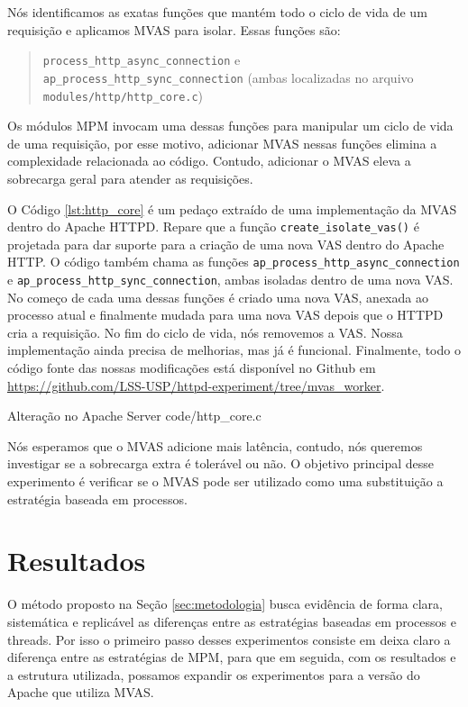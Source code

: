 Nós identificamos as exatas funções que mantém todo o ciclo de vida de um
requisição e aplicamos MVAS para isolar. Essas funções são:

\begin{quote}
  \texttt{process\_http\_async\_connection} e\\
  \texttt{ap\_process\_http\_sync\_connection} (ambas localizadas no arquivo
  \texttt{modules/http/http\_core.c})
\end{quote}

Os módulos MPM invocam uma dessas funções para manipular um ciclo de vida de
uma requisição, por esse motivo, adicionar MVAS nessas funções elimina a
complexidade relacionada ao código. Contudo, adicionar o MVAS eleva a
sobrecarga geral para atender as requisições.

O Código \ref{lst:http_core} é um pedaço extraído de uma implementação da MVAS
dentro do Apache HTTPD. Repare que a função \texttt{create\_isolate\_vas()} é
projetada para dar suporte para a criação de uma nova VAS dentro do Apache
HTTP. O código também chama as funções
\texttt{ap\_process\_http\_async\_connection} e
\texttt{ap\_process\_http\_sync\_connection}, ambas isoladas dentro de uma nova
VAS. No começo de cada uma dessas funções é criado uma nova VAS, anexada ao
processo atual e finalmente mudada para uma nova VAS depois que o HTTPD cria a
requisição. No fim do ciclo de vida, nós removemos a VAS. Nossa implementação
ainda precisa de melhorias, mas já é funcional. Finalmente, todo o código fonte
das nossas modificações está disponível no Github em
\url{https://github.com/LSS-USP/httpd-experiment/tree/mvas\_worker}.

\begin{ruledcaption}{Alteração no Apache Server\label{lst:http_core}}
 {code/http_core.c}
\end{ruledcaption}

Nós esperamos que o MVAS adicione mais latência, contudo, nós queremos
investigar se a sobrecarga extra é tolerável ou não. O objetivo principal desse
experimento é verificar se o MVAS pode ser utilizado como uma substituição a
estratégia baseada em processos.

\section{Resultados}
\label{sec:preliminary}

O método proposto na Seção \ref{sec:metodologia} busca evidência de forma
clara, sistemática e replicável as diferenças entre as estratégias baseadas em
processos e threads. Por isso o primeiro passo desses experimentos consiste em
deixa claro a diferença entre as estratégias de MPM, para que em seguida, com
os resultados e a estrutura utilizada, possamos expandir os experimentos para a
versão do Apache que utiliza MVAS.

